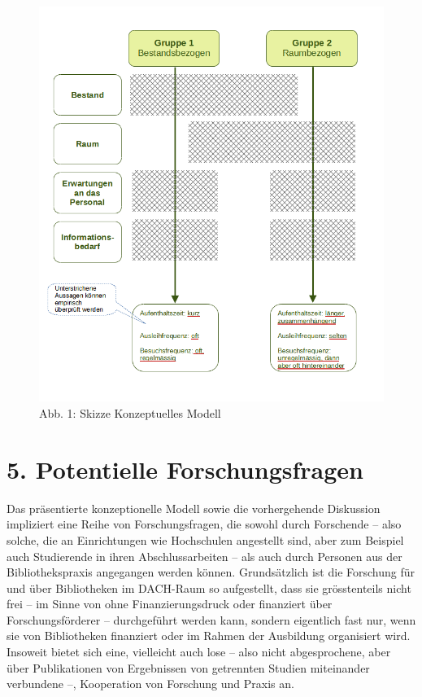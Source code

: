\documentclass[a4paper,
fontsize=11pt,
oneside,
numbers=noperiodatend,
parskip=half-,
bibliography=totoc,
final
]{scrartcl}
\begin{document}
\begin{figure}
\centering
\includegraphics[width=.85\textwidth]{img/Skizze_Modell.png}
\caption{Abb. 1: Skizze Konzeptuelles Modell}
\end{figure}

\hypertarget{potentielle-forschungsfragen}{%
\section{5. Potentielle
Forschungsfragen}\label{potentielle-forschungsfragen}}

Das präsentierte konzeptionelle Modell sowie die vorhergehende
Diskussion impliziert eine Reihe von Forschungsfragen, die sowohl durch
Forschende -- also solche, die an Einrichtungen wie Hochschulen
angestellt sind, aber zum Beispiel auch Studierende in ihren
Abschlussarbeiten -- als auch durch Personen aus der Bibliothekspraxis
angegangen werden können. Grundsätzlich ist die Forschung für und über
Bibliotheken im DACH-Raum so aufgestellt, dass sie grösstenteils nicht
frei -- im Sinne von ohne Finanzierungsdruck oder finanziert über
Forschungsförderer -- durchgeführt werden kann, sondern eigentlich fast
nur, wenn sie von Bibliotheken finanziert oder im Rahmen der Ausbildung
organisiert wird. Insoweit bietet sich eine, vielleicht auch lose --
also nicht abgesprochene, aber über Publikationen von Ergebnissen von
getrennten Studien miteinander verbundene --, Kooperation von Forschung
und Praxis an.
\end{document}

